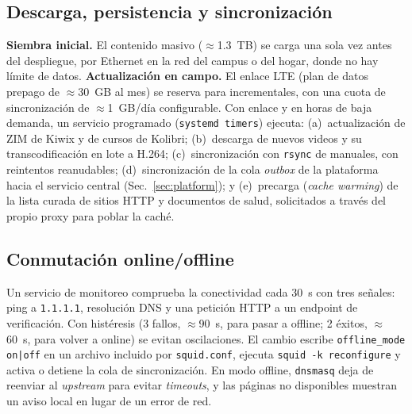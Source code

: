 \documentclass[conference]{IEEEtran}
\begin{document}
\subsection{Descarga, persistencia y sincronización}
\textbf{Siembra inicial.} El contenido masivo ($\approx$1.3~TB) se carga una sola vez antes del despliegue, por Ethernet en la red del campus o del hogar, donde no hay límite de datos. \textbf{Actualización en campo.} El enlace LTE (plan de datos prepago de $\approx$30~GB al mes) se reserva para incrementales, con una cuota de sincronización de $\approx$1~GB/día configurable. Con enlace y en horas de baja demanda, un servicio programado (\texttt{systemd timers}) ejecuta: (a)~actualización de ZIM de Kiwix y de cursos de Kolibri; (b)~descarga de nuevos videos y su transcodificación en lote a H.264; (c)~sincronización con \texttt{rsync} de manuales, con reintentos reanudables; (d)~sincronización de la cola \textit{outbox} de la plataforma hacia el servicio central (Sec.~\ref{sec:platform}); y (e)~precarga (\textit{cache warming}) de la lista curada de sitios HTTP y documentos de salud, solicitados a través del propio proxy para poblar la caché.

\subsection{Conmutación online/offline}\label{sec:switch}
Un servicio de monitoreo comprueba la conectividad cada 30~s con tres señales: ping a \texttt{1.1.1.1}, resolución DNS y una petición HTTP a un endpoint de verificación. Con histéresis (3 fallos, $\approx$90~s, para pasar a offline; 2 éxitos, $\approx$60~s, para volver a online) se evitan oscilaciones. El cambio escribe \texttt{offline\_mode on|off} en un archivo incluido por \texttt{squid.conf}, ejecuta \texttt{squid -k reconfigure} y activa o detiene la cola de sincronización. En modo offline, \texttt{dnsmasq} deja de reenviar al \textit{upstream} para evitar \textit{timeouts}, y las páginas no disponibles muestran un aviso local en lugar de un error de red.

\end{document}
